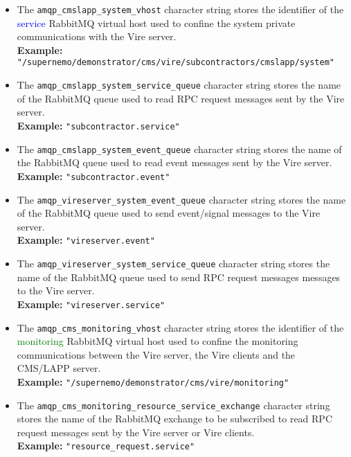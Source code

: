 \begin{itemize}

\item   The  \texttt{amqp\_cmslapp\_system\_vhost}   character  string
  stores  the  identifier  of the  \textcolor{blue}{service}  RabbitMQ
  virtual host used to confine  the system private communications with
  the Vire server.\\
  \noindent \textbf{Example:} \texttt{"/supernemo/demonstrator/cms/vire/subcontractors/cmslapp/system"}

\item      The     \texttt{amqp\_cmslapp\_system\_service\_queue}
  character string stores the name of  the RabbitMQ queue used to read
  RPC request messages sent by the Vire server.\\
  \noindent \textbf{Example:} \texttt{"subcontractor.service"}

\item      The     \texttt{amqp\_cmslapp\_system\_event\_queue}
  character string stores the name of  the RabbitMQ queue used to read
  event messages sent by the Vire server.\\
  \noindent \textbf{Example:} \texttt{"subcontractor.event"}

\item      The     \texttt{amqp\_vireserver\_system\_event\_queue}
  character string stores the name of  the RabbitMQ queue used to send
  event/signal messages to the Vire server.\\
  \noindent \textbf{Example:} \texttt{"vireserver.event"}

\item      The     \texttt{amqp\_vireserver\_system\_service\_queue}
  character string stores the name of  the RabbitMQ queue used to send
  RPC request messages messages to the Vire server.\\
  \noindent \textbf{Example:} \texttt{"vireserver.service"}

\item   The  \texttt{amqp\_cms\_monitoring\_vhost}   character  string
  stores the identifier  of the \textcolor{green}{monitoring} RabbitMQ
  virtual host  used to confine the  monitoring communications between
  the Vire server, the Vire clients and the CMS/LAPP server.\\
  \noindent \textbf{Example:} \texttt{"/supernemo/demonstrator/cms/vire/monitoring"}

\item      The     \texttt{amqp\_cms\_monitoring\_resource\_service\_exchange}
  character string stores the name of  the RabbitMQ exchange to be subscribed to read
  RPC request messages sent by the Vire server or Vire clients.\\
  \noindent \textbf{Example:} \texttt{"resource\_request.service"}


\end{itemize}
